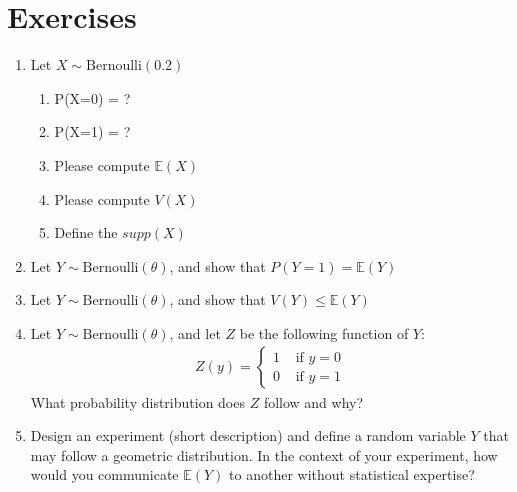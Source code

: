\section{Exercises}

\begin{enumerate}
    \item Let $X \sim \text{Bernoulli}(0.2)$
    \begin{enumerate}
        \item P(X=0) = ?
        \item P(X=1) = ?
        \item Please compute $\mathbb{E}(X)$
        \item Please compute $V(X)$
        \item Define the $supp(X)$
    \end{enumerate}
    
    \item Let $Y \sim \text{Bernoulli}(\theta)$, and 
    show that $P(Y=1) = \mathbb{E}(Y)$

    \item Let $Y \sim \text{Bernoulli}(\theta)$, and 
    show that $V(Y) \leq \mathbb{E}(Y)$
    
    \item Let $Y \sim \text{Bernoulli}(\theta)$, and let $Z$ be the following function of $Y$:
    \begin{align}
        Z(y) = \begin{cases}
                1 & \text{ if } y = 0\\
                0 & \text{ if } y = 1
            \end{cases}
    \end{align}
    What probability distribution does $Z$ follow and why?
    
    \item Design an experiment (short description) and define a random variable $Y$ that may follow a geometric distribution. In the context of your experiment, how would you communicate $\mathbb{E}(Y)$ to another without statistical expertise?
    

\end{enumerate}

